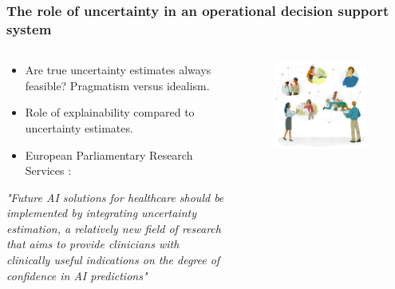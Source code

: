 \begin{frame}
    \frametitle{The role of uncertainty in an operational decision support system}
    \begin{columns}
        \begin{column}{0.6\textwidth}
            \begin{itemize}
                \item Are true uncertainty estimates always feasible? Pragmatism versus idealism.
                \item Role of explainability compared to uncertainty estimates. 
                \item European Parliamentary Research Services \cite{europeanparliament_artificial_2022}:
            \end{itemize}
            \vspace{0.5em}
            \begin{center}
                {\itshape "Future AI solutions for healthcare should be implemented by integrating uncertainty estimation, a relatively new field of research that aims to provide clinicians with clinically useful indications on the degree of confidence in AI predictions"}
            \end{center}
        \end{column}
        \begin{column}{0.4\textwidth}
            \vspace{-2em}
            \begin{figure}[t]
                \centering
                \includegraphics[width=0.9\textwidth]{figures/corti_sketch_conversations.png}
            \end{figure}
        \end{column}
    \end{columns}

\end{frame}


